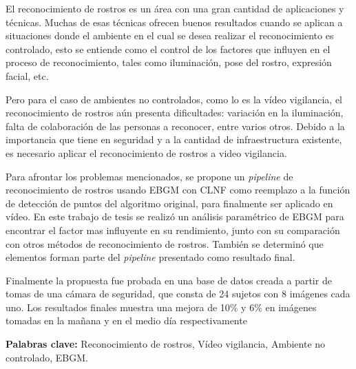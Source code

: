 \begin{resumen}
El reconocimiento de rostros es un área con una gran cantidad de aplicaciones y técnicas. 
Muchas de esas técnicas ofrecen buenos resultados cuando se aplican a situaciones donde el ambiente en el cual se desea realizar el reconocimiento es controlado, esto se entiende como el control de los factores que influyen en el proceso de reconocimiento, tales como iluminación, pose del rostro, expresión facial, etc.

Pero para el caso de ambientes no controlados, como lo es la vídeo vigilancia, el reconocimiento de rostros aún presenta dificultades: variación en la iluminación, falta de colaboración de las personas a reconocer, entre varios otros.
Debido a la importancia que tiene en seguridad y a la cantidad de infraestructura existente, es necesario aplicar el reconocimiento de rostros a video vigilancia.

Para afrontar los problemas mencionados, se propone un \textit{pipeline} de reconocimiento de rostros usando \ac{EBGM} con \ac{CLNF} como reemplazo a la función de detección de puntos del algoritmo original, para finalmente ser aplicado en vídeo. 
En este trabajo de tesis se realizó un análisis paramétrico de \ac{EBGM} para encontrar el factor mas influyente en su rendimiento, junto con su comparación con otros métodos de reconocimiento de rostros. También se determinó que elementos forman parte del \textit{pipeline} presentado como resultado final.

Finalmente la propuesta fue probada en una base de datos creada a partir de tomas de una cámara de seguridad, que consta de 24 sujetos con 8 imágenes cada uno. Los resultados finales muestra una mejora de 10\% y 6\% en imágenes tomadas en la mañana y en el medio día respectivamente

\begin{flushleft}
\textbf{Palabras clave:} Reconocimiento de rostros, Vídeo vigilancia, Ambiente no controlado, \acf{EBGM}.
\end{flushleft}

\end{resumen}

